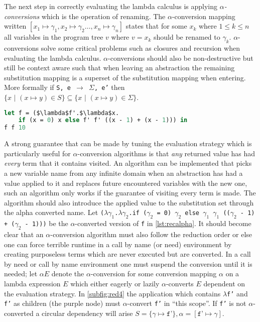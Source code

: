 \documentclass[11pt,oneside,a4paper]{report}
\begin{document}
The next step in correctly evaluating the lambda calculus is applying \textit{$\alpha$-conversions} which is the operation of renaming.
The $\alpha$-conversion mapping written $[x_1 \mapsto \gamma_1, x_2 \mapsto \gamma_2 \dots , x_n \mapsto \gamma_n]$ states that for some $x_k$ where $1 \leq k \leq n$ all variables in the program tree $v$ where $v = x_k$ should be renamed to $\gamma_k$.
$\alpha$-conversions solve some critical problems such as closures and recursion when evaluating the lambda calculus.
$\alpha$-conversions should also be non-destructive but still be context aware such that when leaving an abstraction the remaining substitution mapping is a superset of the substitution mapping when entering.
More formally if \texttt{S, e $\rightarrow$ $\Sigma$, e'} then $\{x \,\,|\,\, (x \mapsto y) \in S\} \subseteq \{x \,\,|\,\, (x \mapsto y) \in \Sigma\}$.
\begin{lstlisting}[language=ML,caption={Recursive addition function},label={lst:recalpha},mathescape=true]
let f = ($\lambda$f'.$\lambda$x.
    if (x = 0) x else f' f' ((x - 1) + (x - 1))) in
f f 10
\end{lstlisting}
A strong guarantee that can be made by tuning the evaluation strategy which is particularly useful for $\alpha$-conversion algorithms is that \textit{any} returned value has had \textit{every} term that it contains visited.
An algorithm can be implemented that picks a new variable name from any infinite domain when an abstraction has had a value applied to it and replaces future encountered variables with the new one, such an algorithm only works if the guarantee of visiting every term is made.
The algorithm should also introduce the applied value to the substitution set through the alpha converted name.
Let \texttt{($\lambda\gamma_1$.$\lambda\gamma_2$.if ($\gamma_2$ = 0) $\gamma_2$ else $\gamma_1$ $\gamma_1$ (($\gamma_2$ - 1) + ($\gamma_2$ - 1)))} be the $\alpha$-converted version of \texttt{f} in \autoref{lst:recalpha}.
It should become clear that an $\alpha$-conversion algorithm must also follow the reduction order or else one can force terrible runtime in a call by name (or need) environment by creating purposeless terms which are never executed but are converted.
In a call by need or call by name environment one must suspend the conversion until it is needed; let $\alpha E$ denote the $\alpha$-conversion for some conversion mapping $\alpha$ on a lambda expression $E$ which either eagerly or lazily $\alpha$-converts $E$ dependent on the evaluation strategy.
In \autoref{subfig:red4} the application which contains \texttt{$\lambda$f'} and \texttt{f'} as children (the purple node) must $\alpha$-convert \texttt{f'} in ``this scope''.
If \texttt{f'} is not $\alpha$-converted a circular dependency will arise $S = \{ \gamma \mapsto \texttt{f'} \}, \alpha = [ \texttt{f'} \mapsto \gamma ]$.
\end{document}
